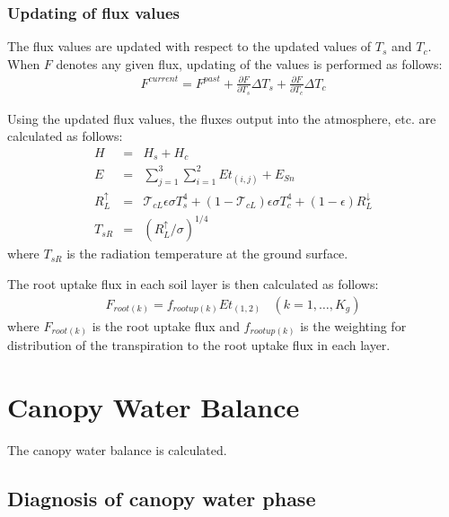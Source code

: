 \hypertarget{updating-of-flux-values}{%
\subsubsection{Updating of flux values}\label{updating-of-flux-values}}

The flux values are updated with respect to the updated values of \(T_s\) and \(T_c\). When \(F\) denotes any given flux, updating of the values is performed as follows: \begin{eqnarray}
 F^{current} = F^{past} + \frac{\partial F}{\partial T_s} \Delta T_s
                        + \frac{\partial F}{\partial T_c} \Delta T_c
\end{eqnarray}

Using the updated flux values, the fluxes output into the atmosphere, etc. are calculated as follows: \begin{eqnarray}
 H &=& H_s + H_c \\
 E &=& \sum_{j=1}^3 \sum_{i=1}^2 Et_{(i,j)} + E_{Sn} \\
 R^{\uparrow}_L &=& {\mathcal{T}}_{cL} \epsilon \sigma T_s^4
 + (1 - {\mathcal{T}}_{cL}) \epsilon \sigma T_c^4
 + (1 - \epsilon) R^{\downarrow}_L \\
 T_{sR} &=& ( R^{\uparrow}_L / \sigma )^{1/4}
\end{eqnarray} where \(T_{sR}\) is the radiation temperature at the ground surface.

The root uptake flux in each soil layer is then calculated as follows: \begin{eqnarray}
 F_{root(k)} = f_{rootup(k)} Et_{(1,2)} \ \ \ \ (k=1,\ldots,K_g)
\end{eqnarray} where \(F_{root(k)}\) is the root uptake flux and \(f_{rootup(k)}\) is the weighting for distribution of the transpiration to the root uptake flux in each layer.

\hypertarget{canopy-water-balance}{%
\section{Canopy Water Balance}\label{canopy-water-balance}}

The canopy water balance is calculated.

\hypertarget{diagnosis-of-canopy-water-phase}{%
\subsection{Diagnosis of canopy water phase}\label{diagnosis-of-canopy-water-phase}}

